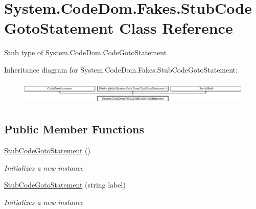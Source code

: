 \hypertarget{class_system_1_1_code_dom_1_1_fakes_1_1_stub_code_goto_statement}{\section{System.\-Code\-Dom.\-Fakes.\-Stub\-Code\-Goto\-Statement Class Reference}
\label{class_system_1_1_code_dom_1_1_fakes_1_1_stub_code_goto_statement}
}


Stub type of System.\-Code\-Dom.\-Code\-Goto\-Statement 


Inheritance diagram for System.\-Code\-Dom.\-Fakes.\-Stub\-Code\-Goto\-Statement\-:\begin{figure}[H]
\begin{center}
\leavevmode
\includegraphics[height=1.155831cm]{class_system_1_1_code_dom_1_1_fakes_1_1_stub_code_goto_statement}
\end{center}
\end{figure}
\subsection*{Public Member Functions}
\begin{DoxyCompactItemize}
\item 
\hyperlink{class_system_1_1_code_dom_1_1_fakes_1_1_stub_code_goto_statement_adaa8d1f1fcc5e70b8d9299135bbf52cb}{Stub\-Code\-Goto\-Statement} ()
\begin{DoxyCompactList}\small\item\em Initializes a new instance\end{DoxyCompactList}\item 
\hyperlink{class_system_1_1_code_dom_1_1_fakes_1_1_stub_code_goto_statement_abb9e40428f2de54c35a69411201104a2}{Stub\-Code\-Goto\-Statement} (string label)
\begin{DoxyCompactList}\small\item\em Initializes a new instance\end{DoxyCompactList}\end{DoxyCompactItemize}
